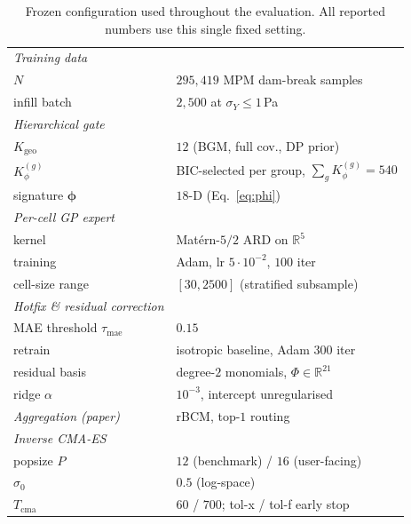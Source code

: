 \begin{table}[!htbp]
\centering
\small
\caption{Frozen configuration used throughout the evaluation. All
reported numbers use this single fixed setting.}
\label{tab:hyper}
\begin{tabular}{@{}ll@{}}
\toprule
\textit{Training data} & \\
\quad $N$                           & $295{,}419$ MPM dam-break samples \\
\quad infill batch                  & $2{,}500$ at $\sigma_Y\le 1$\,Pa \\
\midrule
\textit{Hierarchical gate} & \\
\quad $K_{\mathrm{geo}}$            & $12$ (BGM, full cov., DP prior) \\
\quad $K_{\phi}^{(g)}$              & BIC-selected per group,
                                      $\sum_{g}K_{\phi}^{(g)}=540$ \\
\quad signature $\boldsymbol{\phi}$ & $18$-D (Eq.~\eqref{eq:phi}) \\
\midrule
\textit{Per-cell GP expert} & \\
\quad kernel                        & Mat\'ern-$5/2$ ARD on $\mathbb{R}^{5}$ \\
\quad training                      & Adam, lr $5\cdot 10^{-2}$, $100$ iter \\
\quad cell-size range               & $[30, 2500]$ (stratified subsample) \\
\midrule
\textit{Hotfix \& residual correction} & \\
\quad MAE threshold $\tau_{\mathrm{mae}}$ & $0.15$ \\
\quad retrain                       & isotropic baseline, Adam $300$ iter \\
\quad residual basis                & degree-$2$ monomials,
                                      $\Phi\in\mathbb{R}^{21}$ \\
\quad ridge $\alpha$                & $10^{-3}$, intercept unregularised \\
\midrule
\textit{Aggregation (paper)}        & rBCM, top-$1$ routing \\
\midrule
\textit{Inverse CMA-ES} & \\
\quad popsize $P$                   & $12$ (benchmark) / $16$ (user-facing) \\
\quad $\sigma_{0}$                  & $0.5$ (log-space) \\
\quad $T_{\mathrm{cma}}$            & $60$ / $700$; tol-x / tol-f early stop \\

\end{tabular}
\end{table}
